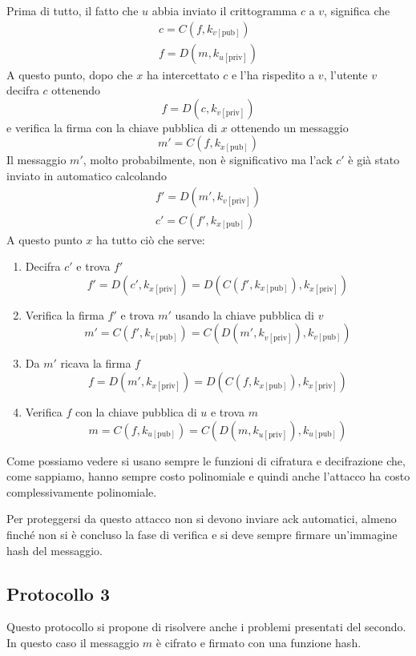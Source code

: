 Prima di tutto, il fatto che $u$ abbia inviato il crittogramma $c$ a $v$, significa che
\begin{gather*}
	c = C(f, k_{v [\text{pub}]}) \\
	f = D(m, k_{u [\text{priv}]})
\end{gather*}
A questo punto, dopo che $x$ ha intercettato $c$ e l'ha rispedito a $v$, l'utente $v$ decifra $c$ ottenendo
\[ f = D(c, k_{v [\text{priv}]}) \]
e verifica la firma con la chiave pubblica di $x$ ottenendo un messaggio
\[ m' = C(f, k_{x [\text{pub}]}) \]
Il messaggio $m'$, molto probabilmente, non \`e significativo ma l'ack $c'$ \`e gi\`a stato inviato in automatico
calcolando
\begin{gather*}
	f' = D(m', k_{v [\text{priv}]}) \\
	c' = C(f', k_{x [\text{pub}]})
\end{gather*}
A questo punto $x$ ha tutto ci\`o che serve:
\begin{enumerate}
	\item Decifra $c'$ e trova $f'$
	      \[ f' = D(c', k_{x [\text{priv}]}) = D(C(f', k_{x [\text{pub}]}), k_{x [\text{priv}]}) \]
	\item Verifica la firma $f'$ e trova $m'$ usando la chiave pubblica di $v$
	      \[ m' = C(f', k_{v [\text{pub}]}) = C(D(m', k_{v [\text{priv}]}), k_{v [\text{pub}]}) \]
	\item Da $m'$ ricava la firma $f$
	      \[ f = D(m', k_{x [\text{priv}]}) = D(C(f, k_{x [\text{pub}]}), k_{x [\text{priv}]}) \]
	\item Verifica $f$ con la chiave pubblica di $u$ e trova $m$
	      \[ m = C(f, k_{u [\text{pub}]}) = C(D(m, k_{u [\text{priv}]}), k_{u [\text{pub}]}) \]
\end{enumerate}
Come possiamo vedere si usano sempre le funzioni di cifratura e decifrazione che, come sappiamo, hanno sempre costo
polinomiale e quindi anche l'attacco ha costo complessivamente polinomiale.

Per proteggersi da questo attacco non si devono inviare ack automatici, almeno finch\'e non si \`e concluso la fase
di verifica e si deve sempre firmare un'immagine hash del messaggio.

\subsection{Protocollo 3}
Questo protocollo si propone di risolvere anche i problemi presentati del secondo. In questo caso il messaggio
$m$ \`e cifrato e firmato con una funzione hash.

